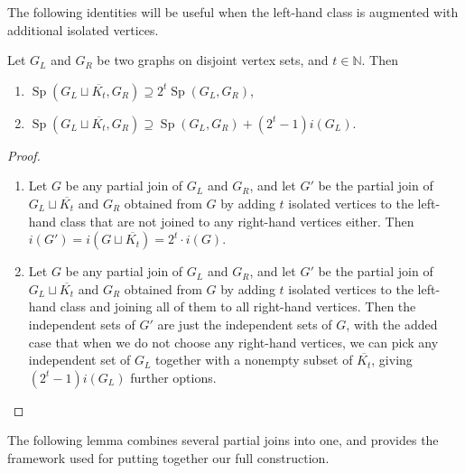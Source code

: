 \documentclass[10pt,a4paper]{article}
\numberwithin{equation}{section}
\newcommand{\nn}{\mathbb{N}}
\DeclareMathOperator{\Sp}{Sp}
\begin{document}
The following identities will be useful when the left-hand class is augmented with additional isolated vertices.

\begin{lemma}\label{lem:spectrumscaling}
Let $G_L$ and $G_R$ be two graphs on disjoint vertex sets, and $t\in \nn$. Then
\begin{enumerate}[label=(\alph*)]
\item $\Sp(G_L\sqcup \overline{K_t}, G_R)\supseteq 2^t\Sp(G_L, G_R)$,
\item $\Sp(G_L\sqcup \overline{K_t}, G_R) \supseteq \Sp(G_L, G_R) + (2^t-1)i(G_L)$.
\end{enumerate}
\end{lemma}
\begin{proof}
\begin{enumerate}[label=(\alph*)]
\item Let $G$ be any partial join of $G_L$ and $G_R$, and let $G'$ be the partial join of $G_L\sqcup \overline{K_t}$ and $G_R$ obtained from $G$ by adding $t$ isolated vertices to the left-hand class that are not joined to any right-hand vertices either. Then $i(G')=i(G\sqcup \overline{K_t})=2^t\cdot i(G)$.
\item Let $G$ be any partial join of $G_L$ and $G_R$, and let $G'$ be the partial join of $G_L\sqcup \overline{K_t}$ and $G_R$ obtained from $G$ by adding $t$ isolated vertices to the left-hand class and joining all of them to all right-hand vertices. Then the independent sets of $G'$ are just the independent sets of $G$, with the added case that when we do not choose any right-hand vertices, we can pick any independent set of $G_L$ together with a nonempty subset of $\overline{K_t}$, giving $(2^t-1)i(G_L)$ further options.
\qedhere
\end{enumerate}
\end{proof}

The following lemma combines several partial joins into one, and provides the framework used for putting together our full construction.
\end{document}
